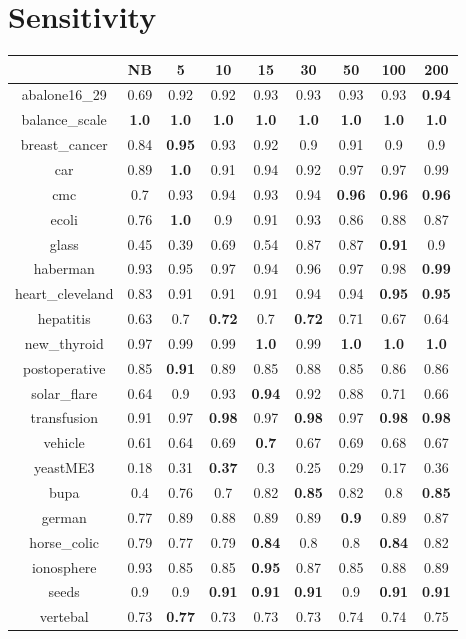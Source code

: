 \documentclass{article}%
\begin{document}
%
\section*{Sensitivity}%
\begin{tabular}{c|cccccccc}%
\hline%
&NB&5&10&15&30&50&100&200\\%
\hline%
abalone16\_29&0.69&0.92&0.92&0.93&0.93&0.93&0.93&\textbf{0.94}\\%
\hline%
balance\_scale&\textbf{1.0}&\textbf{1.0}&\textbf{1.0}&\textbf{1.0}&\textbf{1.0}&\textbf{1.0}&\textbf{1.0}&\textbf{1.0}\\%
\hline%
breast\_cancer&0.84&\textbf{0.95}&0.93&0.92&0.9&0.91&0.9&0.9\\%
\hline%
car&0.89&\textbf{1.0}&0.91&0.94&0.92&0.97&0.97&0.99\\%
\hline%
cmc&0.7&0.93&0.94&0.93&0.94&\textbf{0.96}&\textbf{0.96}&\textbf{0.96}\\%
\hline%
ecoli&0.76&\textbf{1.0}&0.9&0.91&0.93&0.86&0.88&0.87\\%
\hline%
glass&0.45&0.39&0.69&0.54&0.87&0.87&\textbf{0.91}&0.9\\%
\hline%
haberman&0.93&0.95&0.97&0.94&0.96&0.97&0.98&\textbf{0.99}\\%
\hline%
heart\_cleveland&0.83&0.91&0.91&0.91&0.94&0.94&\textbf{0.95}&\textbf{0.95}\\%
\hline%
hepatitis&0.63&0.7&\textbf{0.72}&0.7&\textbf{0.72}&0.71&0.67&0.64\\%
\hline%
new\_thyroid&0.97&0.99&0.99&\textbf{1.0}&0.99&\textbf{1.0}&\textbf{1.0}&\textbf{1.0}\\%
\hline%
postoperative&0.85&\textbf{0.91}&0.89&0.85&0.88&0.85&0.86&0.86\\%
\hline%
solar\_flare&0.64&0.9&0.93&\textbf{0.94}&0.92&0.88&0.71&0.66\\%
\hline%
transfusion&0.91&0.97&\textbf{0.98}&0.97&\textbf{0.98}&0.97&\textbf{0.98}&\textbf{0.98}\\%
\hline%
vehicle&0.61&0.64&0.69&\textbf{0.7}&0.67&0.69&0.68&0.67\\%
\hline%
yeastME3&0.18&0.31&\textbf{0.37}&0.3&0.25&0.29&0.17&0.36\\%
\hline%
bupa&0.4&0.76&0.7&0.82&\textbf{0.85}&0.82&0.8&\textbf{0.85}\\%
\hline%
german&0.77&0.89&0.88&0.89&0.89&\textbf{0.9}&0.89&0.87\\%
\hline%
horse\_colic&0.79&0.77&0.79&\textbf{0.84}&0.8&0.8&\textbf{0.84}&0.82\\%
\hline%
ionosphere&0.93&0.85&0.85&\textbf{0.95}&0.87&0.85&0.88&0.89\\%
\hline%
seeds&0.9&0.9&\textbf{0.91}&\textbf{0.91}&\textbf{0.91}&0.9&\textbf{0.91}&\textbf{0.91}\\%
\hline%
vertebal&0.73&\textbf{0.77}&0.73&0.73&0.73&0.74&0.74&0.75\\%
\hline%
\end{tabular}
\end{document}
